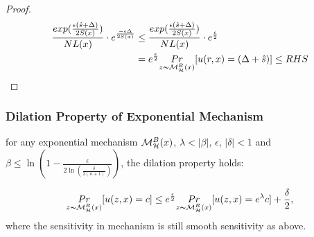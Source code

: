 \documentclass[sigconf]{acmart}
\begin{document}
\begin{proof}
\begin{equation*}
\begin{split}
\frac{exp(\frac{\epsilon (\hat{s} + \Delta)}{2 S(x)})}{NL(x)} \cdot e^{\frac{- \epsilon \Delta}{2 S(x)}}
& \leq \frac{exp(\frac{\epsilon (\hat{s} + \Delta)}{2 S(x)})}{NL(x)} \cdot e^{\frac{\epsilon}{2}}\\
&  =  e^{\frac{\epsilon}{2}} \underset{z \thicksim \mathcal{M}^{B}_{\mathcal{H}}(x)}{Pr}[u(r,x) = (\Delta + \hat{s})] \leq RHS\\
\end{split}
\end{equation*}

\end{proof}

\subsubsection{Dilation Property of Exponential Mechanism}
\begin{lem}
for any exponential mechanism $\mathcal{M}^{B}_{\mathcal{H}}(x)$, $\lambda < |\beta|$, $\epsilon$, $|\delta| < 1$ and $\beta \leq \ln(1 - \frac{\epsilon}{2 \ln (\frac{\delta}{2 (n + 1)})})$, the dilation property holds:

\begin{equation*}
\underset{z \thicksim \mathcal{M}^{B}_{\mathcal{H}}(x)}{Pr}[u(z,x) = c]
\leq
e^{\frac{\epsilon}{2}} \underset{z \thicksim \mathcal{M}^{B}_{\mathcal{H}}(x)}{Pr}[u(z,x) = e^{\lambda} c] + \frac{\delta}{2},
\end{equation*}
where the sensitivity in mechanism is still smooth sensitivity as above.
\end{lem}
\end{document}
